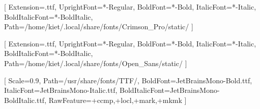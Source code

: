 
\usepackage[vietnamese]{babel}
\usepackage{fontspec}

\setmainfont{CrimsonPro}[
    Extension=.ttf,
    UprightFont=*-Regular,
    BoldFont=*-Bold,
    ItalicFont=*-Italic,
    BoldItalicFont=*-BoldItalic,
    Path=/home/kiet/.local/share/fonts/Crimson_Pro/static/
]

\setsansfont{OpenSans}[
    Extension=.ttf,
    UprightFont=*-Regular,
    BoldFont=*-Bold,
    ItalicFont=*-Italic,
    BoldItalicFont=*-BoldItalic,
    Path=/home/kiet/.local/share/fonts/Open_Sans/static/
]

\setmonofont{JetBrainsMono-Regular.ttf}[
    Scale=0.9,
    Path=/usr/share/fonts/TTF/,
    BoldFont=JetBrainsMono-Bold.ttf,
    ItalicFont=JetBrainsMono-Italic.ttf,
    BoldItalicFont=JetBrainsMono-BoldItalic.ttf,
    RawFeature={+ccmp,+locl,+mark,+mkmk}
]

\usepackage{anyfontsize}

\renewcommand{\normalsize}{\fontsize{13}{20}\selectfont}
\renewcommand{\small}{\fontsize{11}{13}\selectfont}
\renewcommand{\footnotesize}{\fontsize{10}{12}\selectfont}
\renewcommand{\large}{\fontsize{14}{17}\selectfont}
\renewcommand{\Large}{\fontsize{16}{19}\selectfont}
\renewcommand{\LARGE}{\fontsize{18}{22}\selectfont}
\renewcommand{\huge}{\fontsize{20}{24}\selectfont}
\renewcommand{\Huge}{\fontsize{24}{28}\selectfont}
